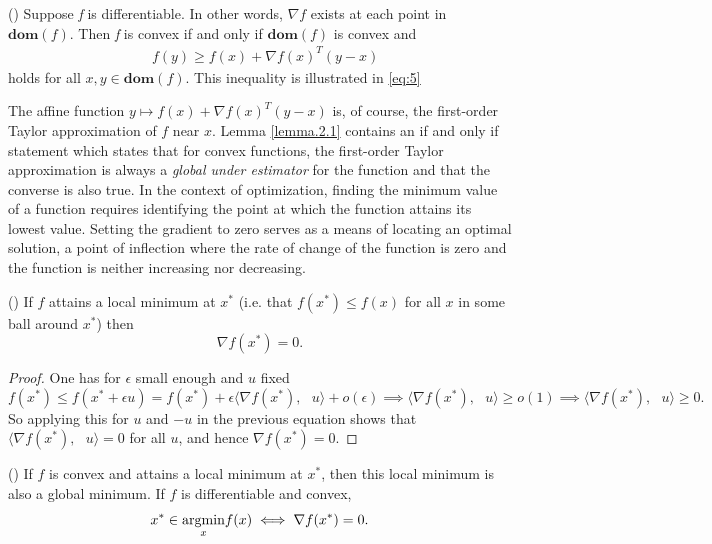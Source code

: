 \begin{lemma}\label{lemma.2.1}
\textnormal{(\cite[69]{boyd2004convex})}
Suppose \textit{f} is differentiable. In other words, $\nabla f$ exists at each point in $\textbf{dom} (f)$. Then \textit{f} is convex if and only if $\textbf{dom} (f)$ is convex and
\begin{equation*}\label{eq:5}\tag{2.2.2}
\begin{aligned}
    &f(y) \geq f(x) + \nabla f(x)^{T}(y-x)
\end{aligned}
\end{equation*}
holds for all $x,y \in \textbf{dom} (f)$. This inequality is illustrated in \ref{eq:5}
\end{lemma}
The affine function $y \mapsto f(x) + \nabla f(x)^{T}(y-x)$ is, of course, the first-order Taylor approximation of $f$ near $x$. Lemma \ref{lemma.2.1} contains an if and only if statement which states that for convex functions, the first-order Taylor approximation is always a \textit{global under estimator} for the function and that the converse is also true. In the context of optimization, finding the minimum value of a function requires identifying the point at which the function attains its lowest value. Setting the gradient to zero serves as a means of locating an optimal solution, a point of inflection where the rate of change of the function is zero and the function is neither increasing nor decreasing. 
\begin{proposition}\label{eq:local_conv}
\textnormal{(\cite[7]{coursenotesML})}
If $f$ attains a local minimum at $x^{*}$ (i.e. that $f(x^{*}) \leq f(x) $ for all $x$ in some ball around $x^{*}$) then $$\nabla f(x^{*}) = 0.$$
\end{proposition}
\begin{proof}
One has for $\epsilon$ small enough and $u$ fixed
$$f(x^{*}) \leq f(x^{*} + \epsilon u) = f(x^{*}) + \epsilon \langle \nabla f(x^{*}),\text{ }u\rangle + o(\epsilon) \implies \langle \nabla f(x^{*}),\text{ }u\rangle \geq o(1) \implies \langle \nabla f(x^{*}),\text{ }u\rangle \geq 0.$$ So applying this for $u$ and $-u$ in the previous equation shows that $\langle \nabla f(x^{*}),\text{ }u\rangle = 0$ for all $u$, and hence $\nabla f(x^{*}) = 0.$
\end{proof}
\begin{proposition}\label{eq:argmin_conv}
\textnormal{(\cite[7]{coursenotesML})}
If $f$ is convex and attains a local minimum at $x^{*}$, then this local minimum is also a global minimum. If $f$ is differentiable and convex, $$x^{*} \in \underset{x}{\textnormal{argmin}}f(x) \iff \nabla f(x^{*}) = 0.$$
\end{proposition}
